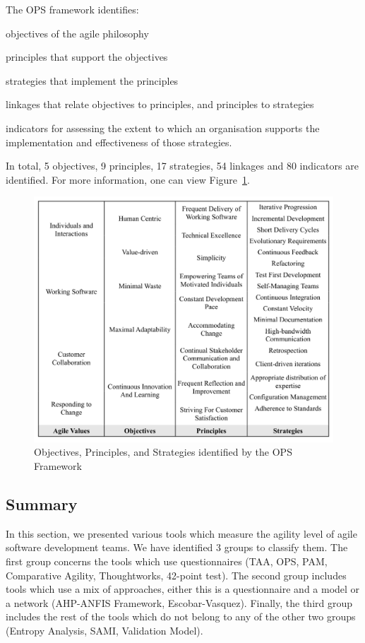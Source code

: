 
The \ac{OPS} framework identifies:
\begin{inparaenum} [a\upshape)]
\item objectives of the agile philosophy
\item principles that support the objectives
\item strategies that implement the principles
\item linkages that relate objectives to
principles, and principles to strategies
\item indicators for assessing the extent to which an organisation supports the implementation and effectiveness of those strategies.
\end{inparaenum}

In total, 5 objectives, 9 principles, 17 strategies, 54 linkages and 80 indicators are identified. For more information, one can view  Figure~\ref{objectives_principles_strategies}.

\begin{figure} [H]
\centerline{\includegraphics[scale=0.75]{include/relatedwork/fig/ops.pdf}}
\caption{Objectives, Principles, and Strategies identified by the \ac{OPS} Framework} 
\label{objectives_principles_strategies}
\end{figure}

\subsection{Summary}
In this section, we presented various tools which measure the agility level of agile software development teams. We have identified 3 groups to classify them. The first group concerns the tools which use questionnaires (\ac{TAA}, \ac{OPS}, \ac{PAM}, Comparative Agility, Thoughtworks, 42-point test). The second group includes tools which use a mix of approaches, either this is a questionnaire and a model or a network (AHP-ANFIS Framework, Escobar-Vasquez). Finally, the third group includes the rest of the tools which do not belong to any of the other two groups (Entropy Analysis, SAMI, Validation Model).

